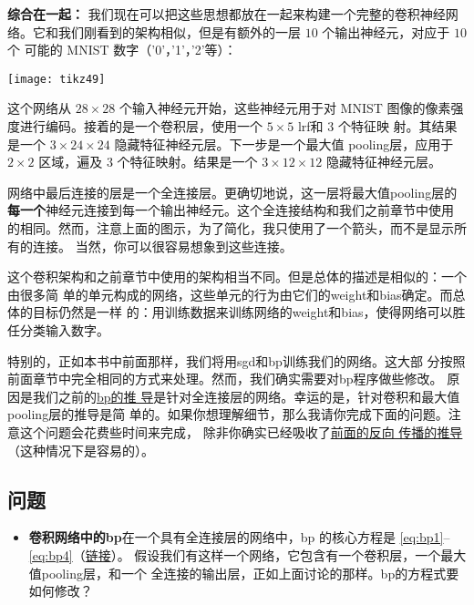 \textbf{综合在一起：} 我们现在可以把这些思想都放在一起来构建一个完整的卷积神经网
络。它和我们刚看到的架构相似，但是有额外的一层 $10$ 个输出神经元，对应于 $10$ 个
可能的 MNIST 数字（'0'，'1'，'2'等）：
\begin{center}
  \texttt{[image: tikz49]}  
\end{center}

这个网络从 $28 \times 28$ 个输入神经元开始，这些神经元用于对 MNIST 图像的像素强
度进行编码。接着的是一个卷积层，使用一个 $5 \times 5$ \gls*{lrf}和 $3$ 个特征映
射。其结果是一个 $3 \times 24 \times 24$ 隐藏特征神经元层。下一步是一个最大值%
\gls*{pooling}层，应用于 $2 \times 2$ 区域，遍及 $3$ 个特征映射。结果是一个 $3
\times 12 \times 12$ 隐藏特征神经元层。

网络中最后连接的层是一个全连接层。更确切地说，这一层将最大值\gls*{pooling}层的%
\textbf{每一个}神经元连接到每一个输出神经元。这个全连接结构和我们之前章节中使用
的相同。然而，注意上面的图示，为了简化，我只使用了一个箭头，而不是显示所有的连接。
当然，你可以很容易想象到这些连接。

这个卷积架构和之前章节中使用的架构相当不同。但是总体的描述是相似的：一个由很多简
单的单元构成的网络，这些单元的行为由它们的\gls*{weight}和\gls*{bias}确定。而总体的目标仍然是一样
的：用训练数据来训练网络的\gls*{weight}和\gls*{bias}，使得网络可以胜任分类输入数字。

特别的，正如本书中前面那样，我们将用\gls*{sgd}和\gls*{bp}训练我们的网络。这大部
分按照前面章节中完全相同的方式来处理。然而，我们确实需要对\gls*{bp}程序做些修改。
原因是我们之前的\hyperref[ch:HowThebackpropagationalgorithmworks]{\gls*{bp}的推
  导}是针对全连接层的网络。幸运的是，针对卷积和最大值\gls*{pooling}层的推导是简
单的。如果你想理解细节，那么我请你完成下面的问题。注意这个问题会花费些时间来完成，
除非你确实已经吸收了\hyperref[ch:HowThebackpropagationalgorithmworks]{前面的反向
  传播的推导}（这种情况下是容易的）。

\subsection*{问题}

\begin{itemize}
\item \textbf{卷积网络中的\gls*{bp}}\quad 在一个具有全连接层的网络中，\gls*{bp}
  的核心方程是 \eqref{eq:bp1}--\eqref{eq:bp4}（\hyperref[backpropsummary]{链接}）。
  假设我们有这样一个网络，它包含有一个卷积层，一个最大值\gls*{pooling}层，和一个
  全连接的输出层，正如上面讨论的那样。\gls*{bp}的方程式要如何修改？
\end{itemize}

